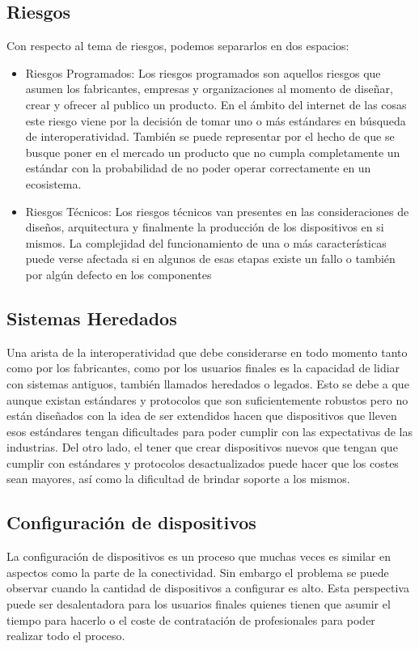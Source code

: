 \subsection{Riesgos}
Con respecto al tema de riesgos, podemos separarlos en dos espacios:
\begin{itemize}
\item Riesgos Programados: Los riesgos programados son aquellos riesgos que asumen los fabricantes, empresas y organizaciones al momento de diseñar, crear y ofrecer al publico un producto. En el ámbito del internet de las cosas este riesgo viene por la decisión de tomar uno o más estándares en búsqueda de interoperatividad. También se puede representar por el hecho de que se busque poner en el mercado un producto que no cumpla completamente un estándar con la probabilidad de no poder operar correctamente en un ecosistema.
\item Riesgos Técnicos: Los riesgos técnicos van presentes en las consideraciones de diseños, arquitectura y finalmente la producción de los dispositivos en si mismos. La complejidad del funcionamiento de una o más características puede verse afectada si en algunos de esas etapas existe un fallo o también por algún defecto en los componentes 
\end{itemize}

\subsection{Sistemas Heredados}
Una arista de la interoperatividad que debe considerarse en todo momento tanto como por los fabricantes, como por los usuarios finales es la capacidad de lidiar con sistemas antiguos, también llamados heredados o legados. Esto se debe a que aunque existan estándares y protocolos que son suficientemente robustos pero no están diseñados con la idea de ser extendidos hacen que dispositivos que lleven esos estándares tengan dificultades para poder cumplir con las expectativas de las industrias. Del otro lado, el tener que crear dispositivos nuevos que tengan que cumplir con estándares y protocolos desactualizados puede hacer que los costes sean mayores, así como la dificultad de brindar soporte a los mismos. 

\subsection{Configuración de dispositivos}
La configuración de dispositivos es un proceso que muchas veces es similar en aspectos como la parte de la conectividad. Sin embargo el problema se puede observar cuando la cantidad de dispositivos a configurar es alto. Esta perspectiva puede ser desalentadora para los usuarios finales quienes tienen que asumir el tiempo para hacerlo o el coste de contratación de profesionales para poder realizar todo el proceso. 


